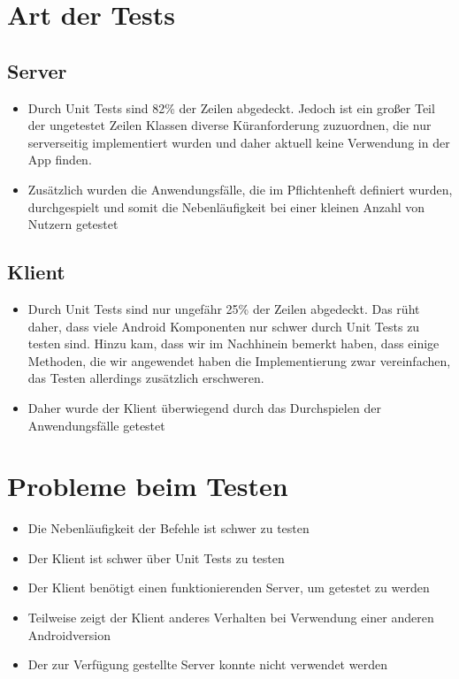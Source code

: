 \documentclass[parskip=full,11pt]{scrartcl}
\begin{document}
\section{Art der Tests}
	\subsection{Server}
		\begin{itemize}
			\item Durch Unit Tests sind 82\% der Zeilen abgedeckt.
						Jedoch ist ein großer Teil der ungetestet Zeilen Klassen
						diverse Küranforderung zuzuordnen, die nur serverseitig
						implementiert wurden und daher aktuell keine Verwendung in
						der App finden.
			\item Zusätzlich wurden die Anwendungsfälle, die im Pflichtenheft
						definiert wurden, durchgespielt und somit die Nebenläufigkeit
						bei einer kleinen Anzahl von Nutzern getestet
		\end{itemize}

	\subsection{Klient}
		\begin{itemize}
			\item Durch Unit Tests sind nur ungefähr 25\% der Zeilen abgedeckt.
						Das rüht daher, dass viele Android Komponenten nur schwer durch Unit Tests
						zu testen sind. Hinzu kam, dass wir im Nachhinein bemerkt haben,
						dass einige Methoden, die wir angewendet haben die Implementierung zwar
						vereinfachen, das Testen allerdings zusätzlich erschweren.
			\item Daher wurde der Klient überwiegend durch das Durchspielen der
						Anwendungsfälle getestet
		\end{itemize}

\section{Probleme beim Testen}
	\begin{itemize}
		\item Die Nebenläufigkeit der Befehle ist schwer zu testen
		\item Der Klient ist schwer über Unit Tests zu testen
		\item Der Klient benötigt einen funktionierenden Server,
					um getestet zu werden
		\item Teilweise zeigt der Klient anderes Verhalten bei Verwendung einer
					anderen Androidversion
		\item Der zur Verfügung gestellte Server konnte nicht verwendet werden
	\end{itemize}
\end{document}
